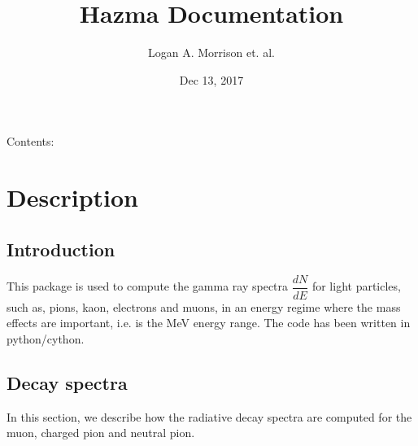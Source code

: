 \documentclass[letterpaper,10pt,english]{sphinxmanual}
\title{Hazma Documentation}
\date{Dec 13, 2017}
\author{Logan A. Morrison et. al.}
\begin{document}
\maketitle
\sphinxtableofcontents
{}\label{\detokenize{index::doc}}


Contents:


\chapter{Description}
\label{\detokenize{Description::doc}}\label{\detokenize{Description:description}}\label{\detokenize{Description:welcome-to-hazma-s-documentation}}

\section{Introduction}
\label{\detokenize{Description:introduction}}
This package is used to compute the gamma ray spectra \(\dfrac{dN}{dE}\) for light particles, such as, pions, kaon, electrons and muons, in an energy regime where the mass effects are important, i.e. is the MeV energy range. The code has been written in python/cython.


\section{Decay spectra}
\label{\detokenize{Description:decay-spectra}}
In this section, we describe how the radiative decay spectra are computed for the muon, charged pion and neutral pion.
\end{document}
